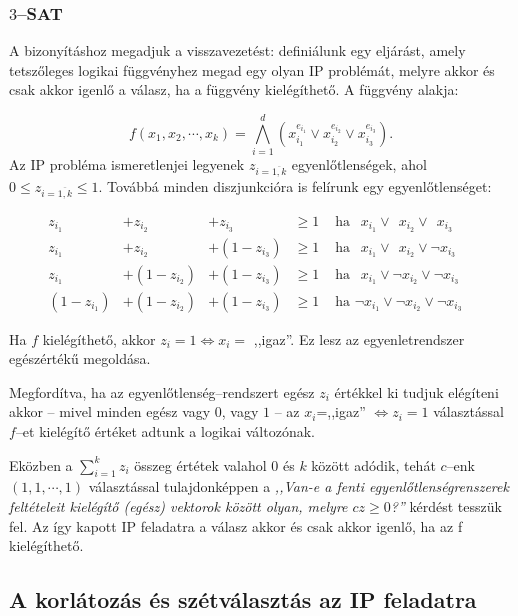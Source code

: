 \subsubsection{$3$--SAT}
A bizonyításhoz megadjuk a visszavezetést: definiálunk egy eljárást, amely tetszőleges
logikai függvényhez megad egy olyan IP problémát, melyre akkor és csak akkor igenlő a
válasz, ha a függvény kielégíthető. A függvény alakja:

\[ f(x_1, x_2, \cdots, x_k) = \bigwedge_{i=1}^{d}{\left( x_{i_1}^{e_{i_1}} \vee
	x_{i_2}^{e_{i_2}} \vee x_{i_3}^{e_{i_3}}\right).}
\]
Az IP probléma ismeretlenjei legyenek $z_{i=\overline{1,k}}$ egyenlőtlenségek,
ahol $0 \leq z_{i=\overline{1,k}} \leq 1$. Továbbá minden diszjunkcióra is felírunk egy
egyenlőtlenséget:


\begin{align*}
	z_{i_1}     & + z_{i_2}     & +      z_{i_3}  & \geq 1 & \mbox{ ha }~~x_{i_1} \vee~~x_{i_2}\vee~~x_{i_3}              & \\
	z_{i_1}     & + z_{i_2}     & + (1 - z_{i_3}) & \geq 1 & \mbox{ ha }~~x_{i_1} \vee~~x_{i_2} \vee \neg x_{i_3}         & \\
	z_{i_1}     & + (1-z_{i_2}) & + (1 - z_{i_3}) & \geq 1 & \mbox{ ha }~~x_{i_1} \vee \neg x_{i_2} \vee\neg x_{i_3}      & \\
	(1-z_{i_1}) & + (1-z_{i_2}) & + (1 - z_{i_3}) & \geq 1 & \mbox{ ha } \neg x_{i_1} \vee \neg x_{i_2} \vee \neg x_{i_3} &
\end{align*}

Ha $f$ kielégíthető, akkor $z_i=1 \Leftrightarrow x_i=$ ,,igaz''. Ez lesz az
egyenletrendszer egészértékű megoldása.

Megfordítva, ha az egyenlőtlenség--rendszert egész $z_i$ értékkel ki tudjuk
elégíteni akkor -- mivel minden egész vagy $0$, vagy $1$ -- az $x_i$=,,igaz''
$\Leftrightarrow z_i=1$ választással $f$--et kielégítő értéket adtunk a logikai
változónak.

Eközben a $\sum_{i=1}^{k}{z_i}$ összeg értétek valahol $0$ és $k$ között adódik,
tehát $c$--enk $(1,1,\cdots,1)$ választással tulajdonképpen a \emph{,,Van-e a fenti
	egyenlőtlenségrenszerek feltételeit kielégítő (egész) vektorok között olyan,
	melyre $cz \geq 0$?''} kérdést tesszük fel. Az így kapott IP feladatra a válasz
akkor és csak akkor igenlő, ha az f kielégíthető.

\subsection{A korlátozás és szétválasztás az IP feladatra}

